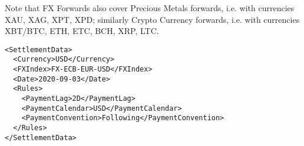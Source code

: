 Note that FX Forwards also cover Precious Metals forwards, i.e. with currencies XAU, XAG, XPT, XPD; similarly Crypto Currency forwards, i.e. with currencies
XBT/BTC, ETH, ETC, BCH, XRP, LTC.

\begin{listing}[H]
\begin{verbatim}
<SettlementData>
  <Currency>USD</Currency>
  <FXIndex>FX-ECB-EUR-USD</FXIndex>
  <Date>2020-09-03</Date>
  <Rules>
    <PaymentLag>2D</PaymentLag>
    <PaymentCalendar>USD</PaymentCalendar>
    <PaymentConvention>Following</PaymentConvention>
  </Rules>
</SettlementData>
\end{verbatim}
\caption{Example \lstinline!SettlementData! node with \lstinline!Rules! sub-node}
\label{lst:settlement_data_node}
\end{listing}
